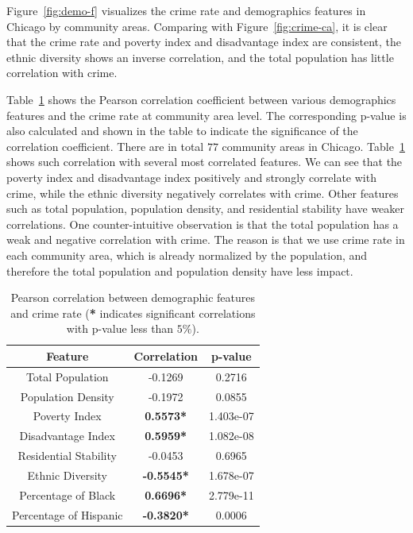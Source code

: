 Figure~\ref{fig:demo-f} visualizes the crime rate and demographics features in Chicago by community areas. Comparing with Figure~\ref{fig:crime-ca}, it is clear that the crime rate and poverty index and disadvantage index are consistent,  the ethnic diversity shows an inverse correlation, and the total population has little correlation with crime.



Table~\ref{tb:demo} shows the Pearson correlation coefficient between various demographics features and the crime rate at community area level. The corresponding p-value is also calculated and shown in the table to indicate the significance of the correlation coefficient.  There  are in total $77$  community areas in Chicago. Table~\ref{tb:demo} shows such correlation with several most correlated features. We can see that the poverty index and disadvantage index positively and strongly correlate with crime, while the ethnic diversity negatively correlates with crime. Other features such as total population, population density, and residential stability  have weaker correlations. One counter-intuitive observation is that the total population has a weak and negative correlation with crime. The reason is that we use crime rate in each community area, which is already normalized by the population, and therefore the total population and population density have less impact. 


\begin{table}[h]
\vspace{-5mm}
\centering
\caption{Pearson correlation between demographic features  and crime rate (\textbf{*} indicates significant correlations with p-value less than $5\%$). }
\begin{tabular}{|c||c|c|}
\hline
Feature & Correlation & p-value \\ \hline \hline
Total Population & -0.1269 &  0.2716 \\ \hline
Population Density & -0.1972  & 0.0855 \\ \hline
Poverty Index & \textbf{0.5573*} & 1.403e-07 \\ \hline
Disadvantage Index & \textbf{0.5959*} & 1.082e-08 \\ \hline
Residential Stability  & -0.0453 &  0.6965 \\ \hline
Ethnic Diversity & \textbf{-0.5545*} &  1.678e-07 \\ \hline
Percentage of Black & \textbf{0.6696*} &  2.779e-11 \\ \hline
Percentage of Hispanic  & \textbf{-0.3820*} &  0.0006 \\ \hline
\end{tabular}
\label{tb:demo}

\end{table}

